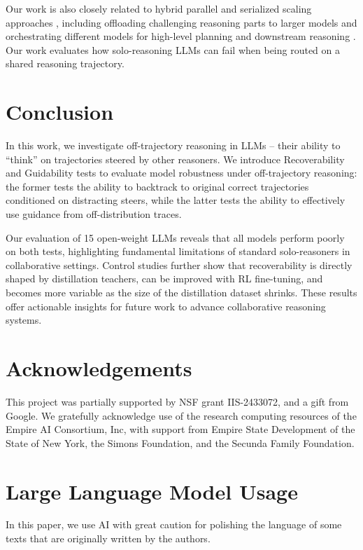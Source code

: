 \documentclass{article} %
\begin{document}
Our work is also closely related to hybrid parallel and serialized scaling approaches \citep{pan2025learning}, including offloading  challenging reasoning parts to larger models \cite{akhauri2025splitreason} and orchestrating different models for high-level planning and downstream reasoning \cite{lee2025collaborative}. Our work evaluates how solo-reasoning LLMs can fail when being routed on a shared reasoning trajectory.

\section{Conclusion}
In this work, we investigate off-trajectory reasoning in LLMs -- their ability to ``think'' on trajectories steered by other reasoners. We introduce Recoverability and Guidability tests to evaluate model robustness under off-trajectory reasoning: the former tests the ability to backtrack to original correct trajectories conditioned on distracting steers, while the latter tests the ability to effectively use guidance from off-distribution traces.

Our evaluation of 15 open-weight LLMs reveals that all models perform poorly on both tests, highlighting fundamental limitations of standard solo-reasoners in collaborative settings. Control studies further show that recoverability is directly shaped by distillation teachers, can be improved with RL fine-tuning, and becomes more variable as the size of the distillation dataset shrinks. These results offer actionable insights for future work to advance collaborative reasoning systems.

\section{Acknowledgements}
This project was partially supported by NSF grant IIS-2433072, and a gift from Google. We gratefully acknowledge use of the research computing resources of the Empire AI Consortium, Inc, with support from Empire State Development of the State of New York, the Simons Foundation, and the Secunda Family Foundation.





\newpage    
\appendix

\section{Large Language Model Usage}
In this paper, we use AI  with great caution for polishing the language of some texts that are originally written by the authors.
\end{document}

